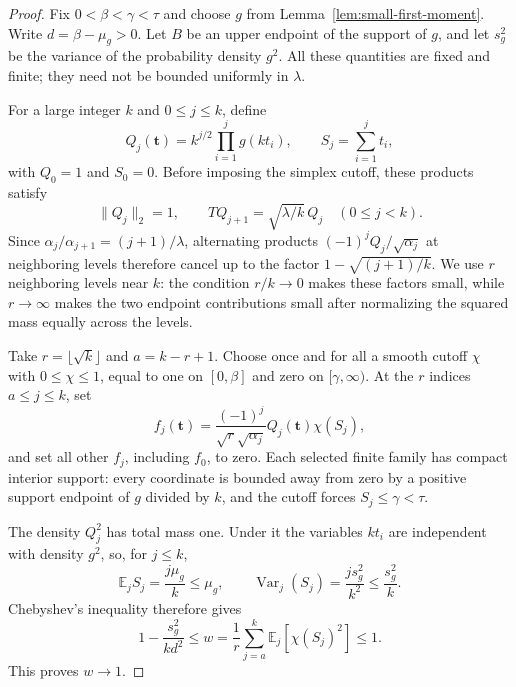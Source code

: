 \begin{proof}
Fix $0<\beta<\gamma<\tau$ and choose $g$ from
Lemma~\ref{lem:small-first-moment}.  Write $d=\beta-\mu_g>0$.
Let $B$ be an upper endpoint of the support of $g$, and let $s_g^2$
be the variance of the probability density $g^2$.  All these
quantities are fixed and finite; they need not be bounded uniformly
in $\lambda$.

For a large integer $k$ and $0\le j\le k$, define
\[
 Q_j(\mathbf t)=k^{j/2}\prod_{i=1}^j g(kt_i),\qquad
 S_j=\sum_{i=1}^j t_i,
\]
with $Q_0=1$ and $S_0=0$.  Before imposing the simplex cutoff, these
products satisfy
\[
 \|Q_j\|_2=1,\qquad TQ_{j+1}=\sqrt{\lambda/k}\,Q_j\quad(0\le j<k).
\]
Since $\alpha_j/\alpha_{j+1}=(j+1)/\lambda$, alternating products
$(-1)^jQ_j/\sqrt{\alpha_j}$ at neighboring levels therefore cancel
up to the factor $1-\sqrt{(j+1)/k}$.  We use $r$ neighboring levels
near $k$: the condition $r/k\to0$ makes these factors small, while
$r\to\infty$ makes the two endpoint contributions small after
normalizing the squared mass equally across the levels.

Take $r=\lfloor\sqrt k\rfloor$ and $a=k-r+1$.  Choose once and for all a smooth cutoff
$\chi$ with $0\le\chi\le1$, equal to one on $[0,\beta]$ and zero on
$[\gamma,\infty)$.  At the $r$ indices $a\le j\le k$, set
\begin{equation}
 f_j(\mathbf t)=\frac{(-1)^j}{\sqrt r\sqrt{\alpha_j}}
                     Q_j(\mathbf t)\chi(S_j),
 \label{eq:active-levels}
\end{equation}
and set all other $f_j$, including $f_0$, to zero.  Each selected finite
family has compact interior support: every coordinate is bounded
away from zero by a positive support endpoint of $g$ divided by $k$,
and the cutoff forces $S_j\le\gamma<\tau$.

The density $Q_j^2$ has total mass one.  Under it the variables $kt_i$
are independent with density $g^2$, so, for $j\le k$,
\[
 \mathbb E_jS_j=\frac{j\mu_g}{k}\le\mu_g,
 \qquad \operatorname{Var}_j(S_j)=\frac{js_g^2}{k^2}
                                      \le\frac{s_g^2}{k}.
\]
Chebyshev's inequality therefore gives
\begin{equation}
 1-\frac{s_g^2}{kd^2}
 \le w=\frac1r\sum_{j=a}^k\mathbb E_j[\chi(S_j)^2]\le1.
 \label{eq:w-concentration}
\end{equation}
This proves $w\to1$.


\end{proof}
